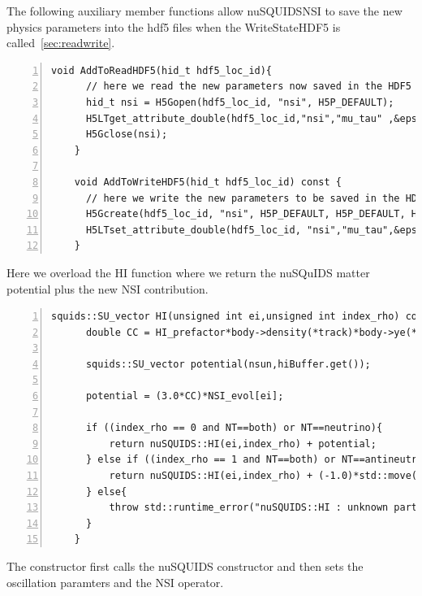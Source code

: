 \documentclass[3p,12pt]{elsarticle}
\newcommand{\ttf}{\ttfamily}
\begin{document}
The following auxiliary member functions allow {\ttf nuSQUIDSNSI} to
save the new physics parameters into the hdf5 files when the
{\ttf WriteStateHDF5} is called~\ref{sec:readwrite}.

\begin{lstlisting}[frame=leftline, numbers =
  left,breaklines=true,label = ex:sin1,firstnumber=last]
    void AddToReadHDF5(hid_t hdf5_loc_id){
      // here we read the new parameters now saved in the HDF5 file
      hid_t nsi = H5Gopen(hdf5_loc_id, "nsi", H5P_DEFAULT);
      H5LTget_attribute_double(hdf5_loc_id,"nsi","mu_tau" ,&epsilon_mutau);
      H5Gclose(nsi);
    }

    void AddToWriteHDF5(hid_t hdf5_loc_id) const {
      // here we write the new parameters to be saved in the HDF5 file
      H5Gcreate(hdf5_loc_id, "nsi", H5P_DEFAULT, H5P_DEFAULT, H5P_DEFAULT);
      H5LTset_attribute_double(hdf5_loc_id, "nsi","mu_tau",&epsilon_mutau, 1);
    }
\end{lstlisting}

Here we overload the {\ttf HI} function where we return the nuSQuIDS
matter potential plus the new NSI contribution.

\begin{lstlisting}[frame=leftline, numbers =
  left,breaklines=true,label = ex:sin1,firstnumber=last]
    squids::SU_vector HI(unsigned int ei,unsigned int index_rho) const{
      double CC = HI_prefactor*body->density(*track)*body->ye(*track);

      squids::SU_vector potential(nsun,hiBuffer.get());

      potential = (3.0*CC)*NSI_evol[ei];

      if ((index_rho == 0 and NT==both) or NT==neutrino){
          return nuSQUIDS::HI(ei,index_rho) + potential;
      } else if ((index_rho == 1 and NT==both) or NT==antineutrino){
          return nuSQUIDS::HI(ei,index_rho) + (-1.0)*std::move(potential);
      } else{
          throw std::runtime_error("nuSQUIDS::HI : unknown particle or antiparticle");
      }
    }
\end{lstlisting}

The constructor first calls the
nuSQUIDS constructor and then sets the oscillation
paramters and the NSI operator.
\end{document}
